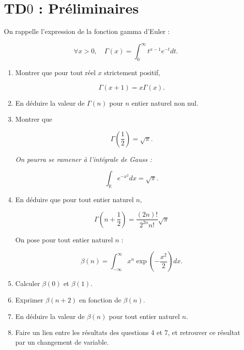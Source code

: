 \chapter*{TD$0$ : Préliminaires}

\setcounter{exercice}{0}

\begin{mdframed}
\begin{exercice}
On rappelle l'expression de la fonction gamma d'Euler :

$$
\forall x > 0, \quad \Gamma(x) = \int_0^\infty t^{x-1}e^{-t}dt.
$$

\begin{enumerate}
\item Montrer que pour tout réel $x$ strictement positif,

$$
\Gamma(x + 1) = x\Gamma(x).
$$
\item  En déduire la valeur de $\Gamma(n)$ pour $n$ entier naturel non nul.
\item Montrer que

$$
\Gamma\left(\frac{1}{2}\right) = \sqrt{\pi}.
$$

\textit{On pourra se ramener à l'intégrale de Gauss :}

$$
\int_{\mathbb{R}} e^{-x^2} dx = \sqrt{\pi}.
$$
\item En déduire que pour tout entier naturel $n$,

$$
\Gamma\left(n + \frac{1}{2}\right) = \frac{(2n)!}{2^{2n}n!} \sqrt{\pi}
$$

On pose pour tout entier naturel $n$ :

$$
\beta(n) = \int_{-\infty}^\infty x^n \exp\left(-\frac{x^2}{2}\right) dx.
$$
\item Calculer $\beta(0)$ et $\beta(1)$.
\item Exprimer $\beta(n + 2)$ en fonction de $\beta(n)$.
\item En déduire la valeur de $\beta(n)$ pour tout entier naturel $n$.
\item Faire un lien entre les résultats des questions 4 et 7, et retrouver ce résultat par un changement de variable.
\end{enumerate}
\end{exercice}
\end{mdframed}


